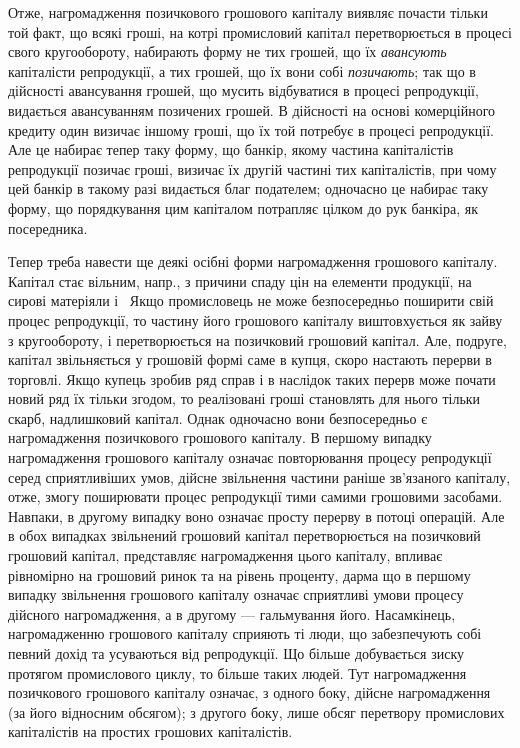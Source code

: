 
Отже, нагромадження позичкового грошового капіталу виявляє почасти
тільки той факт, що всякі гроші, на котрі промисловий капітал перетворюється
в процесі свого кругообороту, набирають форму не тих грошей, що їх
\emph{авансують} капіталісти репродукції, а тих грошей, що їх вони собі \emph{позичають};
так що в дійсності авансування грошей, що мусить відбуватися в процесі
репродукції, видається авансуванням позичених грошей. В дійсності на
основі комерційного кредиту один визичає іншому гроші, що їх той потребує
в процесі репродукції. Але це набирає тепер таку форму, що банкір, якому
частина капіталістів репродукції позичає гроші, визичає їх другій частині
тих капіталістів, при чому цей банкір в такому разі видається благ подателем;
одночасно це набирає таку форму, що порядкування цим капіталом потрапляє
цілком до рук банкіра, як посередника.

Тепер треба навести ще деякі осібні форми нагромадження грошового
капіталу. Капітал стає вільним, напр., з причини спаду цін на елементи продукції,
на сирові матеріяли і~ Якщо промисловець не може безпосередньо поширити
свій процес репродукції, то частину його грошового капіталу виштовхується
як зайву з кругообороту, і перетворюється на позичковий грошовий капітал.
Але, подруге, капітал звільняється у грошовій формі саме в купця, скоро
настають перерви в торговлі. Якщо купець зробив ряд справ і в наслідок таких
перерв може почати новий ряд їх тільки згодом, то реалізовані гроші становлять
для нього тільки скарб, надлишковий капітал. Однак одночасно вони безпосередньо
є нагромадження позичкового грошового капіталу. В першому випадку нагромадження
грошового капіталу означає повторювання процесу репродукції серед
сприятливіших умов, дійсне звільнення частини раніше зв’язаного капіталу,
отже, змогу поширювати процес репродукції тими самими грошовими засобами.
Навпаки, в другому випадку воно означає просту перерву в потоці операцій.
Але в обох випадках звільнений грошовий капітал перетворюється на позичковий
грошовий капітал, представляє нагромадження цього капіталу, впливає рівномірно
на грошовий ринок та на рівень проценту, дарма що в першому випадку
звільнення грошового капіталу означає сприятливі умови процесу дійсного нагромадження,
а в другому — гальмування його. Насамкінець, нагромадженню грошового
капіталу сприяють ті люди, що забезпечують собі певний дохід та усуваються від
репродукції. Що більше добувається зиску протягом промислового циклу, то більше
таких людей. Тут нагромадження позичкового грошового капіталу означає, з одного
боку, дійсне нагромадження (за його відносним обсягом); з другого боку,
лише обсяг перетвору промислових капіталістів на простих грошових капіталістів.

